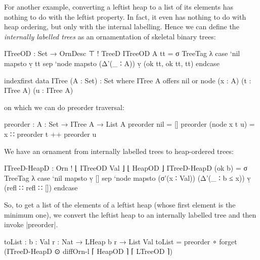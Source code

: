 For another example, converting a leftist heap to a list of its elements has nothing to do with the leftist property.
In fact, it even has nothing to do with heap ordering, but only with the internal labelling.
Hence we can define the \emph{internally labelled trees} as an ornamentation of skeletal binary trees:
\begin{code}
ITreeOD : Set → OrnDesc ⊤ ! TreeD
ITreeOD A tt = σ TreeTag  λ  case  `nil   mapsto  ṿ tt
                             sep   `node  mapsto  (Δ'(_ ∶ A)) ṿ (ok tt, ok tt, tt) endcase

indexfirst data ITree (A : Set) : Set where
  ITree A  offers  nil
           or      node (x : A) (t : ITree A) (u : ITree A)
\end{code}
on which we can do preorder traversal:
\begin{code}
preorder : {A : Set} → ITree A → List A
preorder nil           =  []
preorder (node x t u)  =  x ∷ preorder t ++ preorder u
\end{code}
We have an ornament from internally labelled trees to heap-ordered trees:
\begin{code}
ITreeD-HeapD : Orn ! ⌊ ITreeOD Val ⌋ ⌊ HeapOD ⌋
ITreeD-HeapD (ok b) =
  σ TreeTag λ  case  `nil   mapsto  ṿ []
               sep   `node  mapsto  (σ'(x ∶ Val)) (Δ'(_ ∶ b ≤ x)) ṿ (refl ∷ refl ∷ []) endcase
\end{code}
So, to get a list of the elements of a leftist heap (whose first element is the minimum one), we convert the leftist heap to an internally labelled tree and then invoke |preorder|.
\begin{code}
toList : {b : Val} {r : Nat} → LHeap b r → List Val
toList = preorder ∘ forget (ITreeD-HeapD ⊙ diffOrn-l ⌈ HeapOD ⌉ ⌈ LTreeOD ⌉)
\end{code}

